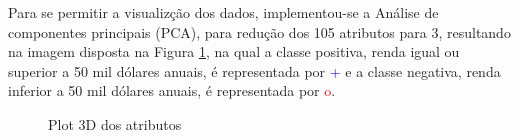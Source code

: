 Para se permitir a visualizção dos dados, implementou-se a Análise de componentes principais (PCA), para redução dos 105 atributos para 3, resultando na imagem disposta na Figura \ref{fig:dados3d}, na qual a classe positiva, renda igual ou superior a 50 mil dólares anuais, é representada por \textcolor{blue}{+} e a classe negativa, renda inferior a 50 mil dólares anuais, é representada por \textcolor{red}{o}.

\begin{figure}[h]
\centering
{}
\caption{Plot 3D dos atributos}
\label{fig:dados3d}
\end{figure}